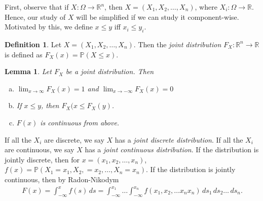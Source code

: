 \documentclass[12pt]{article}
\newcommand{\rr}{\mathbb{R}}
\newcommand{\prob}{\mathbb{P}}
\theoremstyle{plain}
\newtheorem{lemma}[theorem]{Lemma}
\theoremstyle{definition}
\newtheorem*{definition}{Definition}
\theoremstyle{remark}
\numberwithin{equation}{section}  %
\begin{document}
First, observe that if ${X}: \Omega \to \rr^n$, then $X = (X_1, X_2,
\ldots, X_n)$, where $X_i: \Omega \to \rr$. Hence, our study of $X$ will be
simplified if we can study it component-wise. Motivated by this, we define
$x \le y$ iff $x_i \le y_i$. 
\begin{definition}
Let ${X} = (X_1, X_2, \ldots, X_n)$. Then the \emph{joint distribution}
$F_X: \rr^n \to \rr$
is defined as $F_X(x) = \prob({X} \le x)$.
\begin{lemma}
Let $F_X$ be a joint distribution. Then
\begin{enumerate}[a)]
\item
$\lim_{x \to \infty} F_X(x) = 1$ and $\lim_{x \to -\infty}
F_X(x) = 0$
\item
If $x \le y$, then $F_X(x \le F_X(y)$.
\item
$F(x)$ is continuous from above.
\end{enumerate}
\end{lemma}
If all the $X_i$ are discrete, we say $X$ has a \emph{joint discrete
distribution}. If all the $X_i$ are continuous, we say $X$ has a 
\emph{joint continuous distribution}. If the distribution is jointly discrete,
then for $x = (x_1, x_2, \ldots, x_n)$,
 $f(x) = \prob(X_1 = x_1, X_2, = x_2,
\ldots, X_n = x_n)$. If the distribution is jointly continuous, then by
Radon-Nikodym
\begin{align*}
F(x) = \int_{-\infty}^x f(s) \, ds = \int_{-\infty}^{x_1} \ldots
\int_{-\infty}^{x_n} f(x_1, x_2, \ldots x_nx_n) \, ds_1 \, ds_2 \ldots \, ds_n.
\end{align*}


\end{definition}
\end{document}
